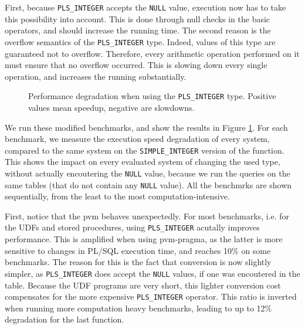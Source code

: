 \documentclass[twoside,11pt,a4paper]{article}
\newcommand{\pls}[1]{\texttt{#1}}
\newcommand{\plstype}[1]{\pls{#1}}
\newcommand{\plsi}{\plstype{PLS\_INTEGER}}
\newcommand{\simpleint}{\plstype{SIMPLE\_INTEGER}}
\newcommand{\plsnull}{\pls{NULL}}
\newcommand{\benchsystem}[1]{\textsf{#1}}
\newcommand{\pvm}{\benchsystem{pvm}}
\newcommand{\pvmg}{\benchsystem{pvm-pragma}}
\begin{document}
First, because \plsi{} accepts the \plsnull{} value, execution now has to take this possibility into account. This is done through null checks in the basic operators, and should increase the running time. The second reason is the overflow semantics of the \plsi{} type. Indeed, values of this type are guaranteed not to overflow. Therefore, every arithmetic operation performed on it must ensure that no overflow occurred. This is slowing down every single operation, and increases the running substantially.

\begin{figure}[tp]
	\centering
	\caption{Performance degradation when using the \plsi{} type. Positive values mean speedup, negative are slowdowns.}
	\label{fig:exp2a}
\end{figure}

We run these modified benchmarks, and show the results in Figure \ref{fig:exp2a}. For each benchmark, we measure the execution speed degradation of every system, compared to the same system on the \simpleint{} version of the function. This shows the impact on every evaluated system of changing the used type, without actually encoutering the \plsnull{} value, because we run the queries on the same tables (that do not contain any \plsnull{} value). All the benchmrks are shown sequentially, from the least to the most computation-intensive.

First, notice that the \pvm{} behaves unexpectedly. For most benchmarks, i.e. for the UDFs and stored procedures, using \plsi{} acutally improves performance. This is amplified when using \pvmg{}, as the latter is more sensitive to changes in PL/SQL execution time, and reaches 10\% on some benchmarks. The reason for this is the fact that conversion is now slightly simpler, as \plsi{} does accept the \plsnull{} values, if one was encoutered in the table. Because the UDF programs are very short, this lighter conversion cost compensates for the more expensive \plsi{} operator. This ratio is inverted when running more computation heavy benchmarks, leading to up to 12\% degradation for the last function.
\end{document}
